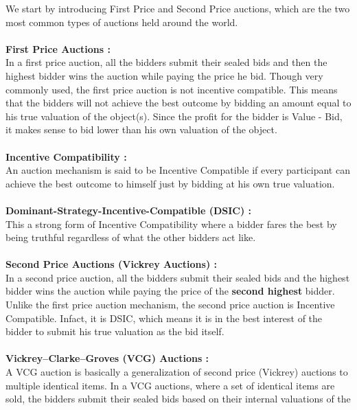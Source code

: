 \documentclass[a4paper]{article}
\begin{document}
We start by introducing First Price and Second Price auctions, which are the two most common types of auctions held around the world. 
\\\\
\textbf{First Price Auctions :} \\In a first price auction, all the bidders submit their sealed bids and then the highest bidder wins the auction while paying the price he bid. Though very commonly used, the first price auction is not incentive compatible. This means that the bidders will not achieve the best outcome by bidding an amount equal to his true valuation of the object(s). Since the profit for the bidder is Value - Bid, it makes sense to bid lower than his own valuation of the object. 
\\\\
\textbf{Incentive Compatibility :}\\ An auction mechanism is said to be Incentive Compatible if every participant can achieve the best outcome to himself just by bidding at his own true valuation. 
\\\\
\textbf{Dominant-Strategy-Incentive-Compatible (DSIC) :} \\This a strong form of Incentive Compatibility where a bidder fares the best by being truthful regardless of what the other bidders act like. 
\\\\
\textbf{Second Price Auctions (Vickrey Auctions) :} \\In a second price auction, all the bidders submit their sealed bids and the highest bidder wins the auction while paying the price of the \textbf{second highest} bidder. Unlike the first price auction mechanism, the second price auction is Incentive Compatible. Infact, it is DSIC, which means it is in the best interest of the bidder to submit his true valuation as the bid itself. 
\\\\
\textbf{ Vickrey–Clarke–Groves (VCG) Auctions :}\\

A VCG auction is basically a generalization of second price (Vickrey) auctions to multiple identical items. In a VCG auctions, where a set of identical items are sold, the bidders submit their sealed bids based on their internal valuations of the 
\end{document}

